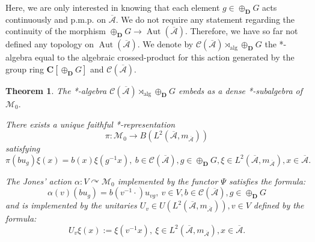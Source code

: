 \documentclass[a4paper,12pt]{amsart}
\numberwithin{equation}{section}
\newtheorem{theo}{Theorem}[section]
\theoremstyle{definition}
\newcommand{\act}{\curvearrowright}
\newcommand{\al}{\alpha}
\newcommand{\oscrA}{{\overline{\mathscr{A}}}}
\DeclareMathOperator{\alg}{alg}
\DeclareMathOperator{\Aut}{Aut}
\newcommand{\scrC}{\mathscr C}
\newcommand{\C}{\mathbf C}
\newcommand{\D}{\mathbf D}
\newcommand{\Gd}{\oplus_\D G}
\newcommand{\scrM}{\mathscr M}
\begin{document}
Here, we are only interested in knowing that each element $g\in\oplus_\D G$ acts continuously and p.m.p. on $\oscrA.$ We do not require any statement regarding the continuity of the morphism $\oplus_\D G\to \Aut(\oscrA)$. Therefore, we have so far not defined any topology on $\Aut(\oscrA)$.
We denote by $\scrC(\oscrA)\rtimes_{\alg} \Gd$ the *-algebra equal to the algebraic crossed-product for this action generated by the group ring $\C[\Gd]$ and $\scrC(\oscrA)$.

\begin{theo}\label{theo:MzeroNC}
The *-algebra $\scrC(\oscrA)\rtimes_{\alg} \Gd$ embeds as a dense *-subalgebra of $\scrM_0.$

There exists a unique faithful *-representation $$\pi:\scrM_0\to B(L^2(\oscrA,m_\oscrA))$$ satisfying 
$$\pi(bu_g)\xi(x) = b(x) \xi(g^{-1} x),\ b\in\scrC(\oscrA), g\in\Gd, \xi \in L^2(\oscrA,m_\oscrA), x\in \oscrA.$$

The Jones' action $\al:V\act\scrM_0$ implemented by the functor $\Psi$ satisfies the formula:
$$\al(v) (b u_g) = b(v^{-1} \cdot ) u_{vg},\ v\in V, b\in \scrC(\oscrA), g\in \Gd$$
and is implemented by the unitaries $U_v\in U(L^2(\oscrA,m_\oscrA)),v\in V$ defined by the formula: 
$$U_v\xi(x):= \xi(v^{-1} x),\ \xi \in L^2(\oscrA,m_\oscrA), x\in \oscrA.$$
\end{theo}
\end{document}
